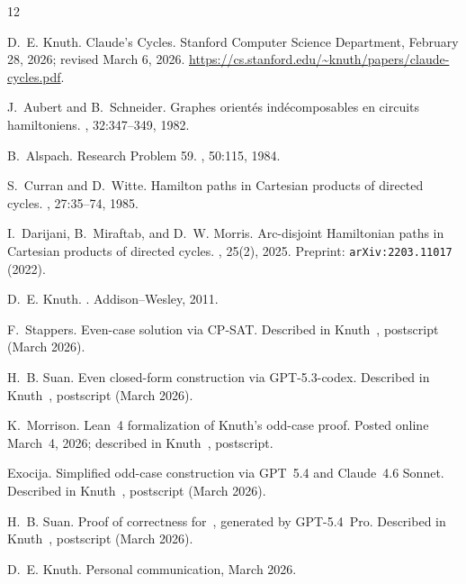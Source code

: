 \documentclass[11pt]{article}
\theoremstyle{definition}
\theoremstyle{remark}
\begin{document}

\begin{thebibliography}{12}

D.~E. Knuth.
\newblock Claude's Cycles.
\newblock Stanford Computer Science Department, February 28, 2026; revised March 6, 2026.
\newblock \url{https://cs.stanford.edu/~knuth/papers/claude-cycles.pdf}.

J.~Aubert and B.~Schneider.
\newblock Graphes orient\'es ind\'ecomposables en circuits hamiltoniens.
, 32:347--349, 1982.

B.~Alspach.
\newblock Research Problem 59.
, 50:115, 1984.

S.~Curran and D.~Witte.
\newblock Hamilton paths in {C}artesian products of directed cycles.
, 27:35--74, 1985.

I.~Darijani, B.~Miraftab, and D.~W. Morris.
\newblock Arc-disjoint {H}amiltonian paths in {C}artesian products of directed cycles.
, 25(2), 2025.
\newblock Preprint: \texttt{arXiv:2203.11017} (2022).

D.~E. Knuth.
.
\newblock Addison--Wesley, 2011.

F.~Stappers.
\newblock Even-case solution via {CP-SAT}.
\newblock Described in Knuth~\cite{knuth2026}, postscript (March 2026).

H.~B. Suan.
\newblock Even closed-form construction via {GPT}-5.3-codex.
\newblock Described in Knuth~\cite{knuth2026}, postscript (March 2026).

K.~Morrison.
\newblock Lean~4 formalization of Knuth's odd-case proof. Posted online March~4, 2026; described in Knuth~\cite{knuth2026}, postscript.

Exocija.
\newblock Simplified odd-case construction via {GPT}~5.4 and {C}laude~4.6 {S}onnet. Described in Knuth~\cite{knuth2026}, postscript (March 2026).

H.~B. Suan.
\newblock Proof of correctness for~\cite{knuth-even-closed}, generated by {GPT}-5.4~{P}ro. Described in Knuth~\cite{knuth2026}, postscript (March 2026).

D.~E. Knuth.
\newblock Personal communication, March 2026.

\end{thebibliography}
\end{document}
